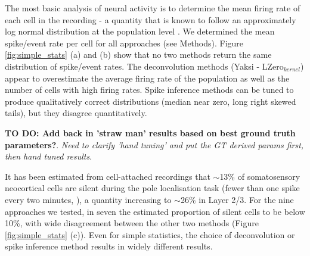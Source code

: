 \documentclass[a4paper,10pt,twocolumn]{article}
\begin{document}
The most basic analysis of neural activity is to determine the mean firing rate of each cell in the recording - a quantity that is known to follow an approximately log normal distribution at the population level \citep{Wohrer2013-rp}. We determined the mean spike/event rate per cell for all approaches (see Methods). Figure \ref{fig:simple_stats} (a) and (b) show that no two methods return the same distribution of spike/event rates. The deconvolution methods (Yaksi - LZero$_{kernel}$) appear to overestimate the average firing rate of the population as well as the number of cells with high firing rates. Spike inference methods can be tuned to produce qualitatively correct distributions (median near zero, long right skewed tails), but they disagree quantitatively. 

\textbf{TO DO: Add back in 'straw man' results based on best ground truth parameters?}. \emph{Need to clarify 'hand tuning' and put the GT derived params first, then hand tuned results}.

It has been estimated from cell-attached recordings that $\sim$13\% of somatosensory neocortical cells are silent during the pole localisation task (fewer than one spike every two minutes, \citealt{OConnor2010-hd}), a quantity increasing to $\sim$26\% in Layer 2/3. For the nine approaches we tested, in seven the estimated proportion of silent cells to be below 10\%, with wide disagreement between the other two methods (Figure \ref{fig:simple_stats} (c)). Even for simple statistics, the choice of deconvolution or spike inference method results in widely different results.

\end{document}

